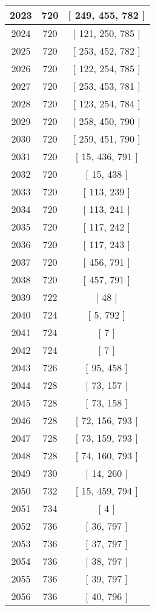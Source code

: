 \begin{center}
\begin{longtable}[H]{|| c c c ||}
\hline
2023 & 720 & [ 249, 455, 782 ] \\ 
\hline
2024 & 720 & [ 121, 250, 785 ] \\ 
\hline
2025 & 720 & [ 253, 452, 782 ] \\ 
\hline
2026 & 720 & [ 122, 254, 785 ] \\ 
\hline
2027 & 720 & [ 253, 453, 781 ] \\ 
\hline
2028 & 720 & [ 123, 254, 784 ] \\ 
\hline
2029 & 720 & [ 258, 450, 790 ] \\ 
\hline
2030 & 720 & [ 259, 451, 790 ] \\ 
\hline
2031 & 720 & [ 15, 436, 791 ] \\ 
\hline
2032 & 720 & [ 15, 438 ] \\ 
\hline
2033 & 720 & [ 113, 239 ] \\ 
\hline
2034 & 720 & [ 113, 241 ] \\ 
\hline
2035 & 720 & [ 117, 242 ] \\ 
\hline
2036 & 720 & [ 117, 243 ] \\ 
\hline
2037 & 720 & [ 456, 791 ] \\ 
\hline
2038 & 720 & [ 457, 791 ] \\ 
\hline
2039 & 722 & [ 48 ] \\ 
\hline
2040 & 724 & [ 5, 792 ] \\ 
\hline
2041 & 724 & [ 7 ] \\ 
\hline
2042 & 724 & [ 7 ] \\ 
\hline
2043 & 726 & [ 95, 458 ] \\ 
\hline
2044 & 728 & [ 73, 157 ] \\ 
\hline
2045 & 728 & [ 73, 158 ] \\ 
\hline
2046 & 728 & [ 72, 156, 793 ] \\ 
\hline
2047 & 728 & [ 73, 159, 793 ] \\ 
\hline
2048 & 728 & [ 74, 160, 793 ] \\ 
\hline
2049 & 730 & [ 14, 260 ] \\ 
\hline
2050 & 732 & [ 15, 459, 794 ] \\ 
\hline
2051 & 734 & [ 4 ] \\ 
\hline
2052 & 736 & [ 36, 797 ] \\ 
\hline
2053 & 736 & [ 37, 797 ] \\ 
\hline
2054 & 736 & [ 38, 797 ] \\ 
\hline
2055 & 736 & [ 39, 797 ] \\ 
\hline
2056 & 736 & [ 40, 796 ] \\ 

\end{longtable}
\end{center}
